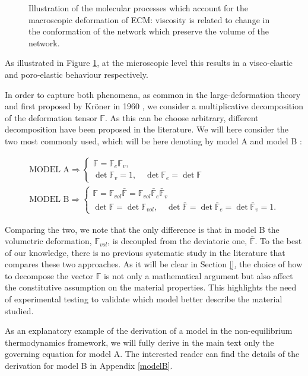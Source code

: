 \documentclass[runningheads]{llncs}
\newcommand{\F}{\ensuremath{\mathbb{F}}}
\begin{document}
\begin{figure}[h!]
	\hspace{-10mm}
	\def\svgwidth{1.2\linewidth}
	
	\caption{Illustration of the molecular processes which account for the macroscopic deformation of ECM: viscosity is related to change in the conformation of the network which preserve the volume of the network.}
	\label{deformation}
\end{figure}
As illustrated in Figure \ref{deformation}, at the microscopic level this results in a visco-elastic and poro-elastic behaviour respectively.

In order to capture both phenomena, as common in the large-deformation theory \cite{Article1,CACCAVO2,Plasto,magneto,NGUYEN,growthtum} and first proposed by Kr\"{o}ner in 1960 \cite{kro}, we consider a multiplicative decomposition of the deformation tensor $\F$. As this can be choose arbitrary, different decomposition have been proposed in the literature. We will here consider the two most commonly used, which will be here denoting by model A \cite{Article1,CACCAVO2,Plasto} and model B \cite{magneto,NGUYEN,Jeru}:

\begin{gather}
\text{MODEL A} \Rightarrow\begin{cases}
\F=\F_e\F_v,\\
\det\F_v=1, \quad \det\F_e=\det\F
\end{cases} \label{dec1}\tag{A}\\[4pt]
\text{MODEL B} \Rightarrow\begin{cases}
\F= \F_{vol}\bar{\F}=\F_{vol}\bar{\F}_e\bar{\F}_v\\
\det\F=\det\F_{vol},\quad \det\bar{\F}=\det\bar{\F}_e=\det\bar{\F}_v=1.
\end{cases}\tag{B}
\end{gather}

Comparing the two, we note that the only difference is that in model B the volumetric deformation, $\F_{vol}$, is decoupled from the deviatoric one, $\bar{\F}$. 
To the best of our knowledge, there is no previous systematic study in the literature that compares these two approaches. As it will be clear in Section \ref{}, the choice of how to decompose the vector $\F$ is not only a mathematical argument but also affect the constitutive assumption on the material properties. This highlights the need of experimental testing to validate which model better describe the material studied.

As an explanatory example of the derivation of a model in the non-equilibrium thermodynamics framework, we will fully derive in the main text only the governing equation for model A. The interested reader can find the details of the derivation for model B in Appendix \ref{modelB}. 
\end{document}
